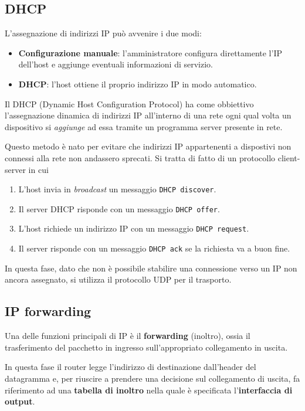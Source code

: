 \subsection{DHCP}
L'assegnazione di indirizzi IP può avvenire i due modi:
\begin{itemize}
	\item \textbf{Configurazione manuale}: l'amministratore configura 
		direttamente l'IP dell'host e aggiunge eventuali informazioni 
		di servizio.
	\item \textbf{DHCP}: l'host ottiene il proprio indirizzo IP in 
		modo automatico.
\end{itemize}
Il DHCP (Dynamic Host Configuration Protocol) ha come obbiettivo 
l'assegnazione dinamica di indirizzi IP all'interno di una rete ogni
qual volta un dispositivo si \emph{aggiunge} ad essa tramite un 
programma server presente in rete.

Questo metodo è nato per evitare che indirizzi IP appartenenti a 
dispostivi non connessi alla rete non andassero sprecati. Si tratta 
di fatto di un protocollo client-server in cui
\begin{enumerate}
	\item L'host invia in \emph{broadcast} un messaggio 
		\verb|DHCP discover|.
	\item Il server DHCP risponde con un messaggio \verb|DHCP offer|.
	\item L'host richiede un indirizzo IP con un messaggio 
		\verb|DHCP request|.
	\item Il server risponde con un messaggio \verb|DHCP ack| se la 
		richiesta va a buon fine.
\end{enumerate}
In questa fase, dato che non è possibile stabilire una connessione 
verso un IP non ancora assegnato, si utilizza il protocollo UDP per 
il trasporto.

\subsection{IP forwarding}
Una delle funzioni principali di IP è il \textbf{forwarding} 
(inoltro), ossia il trasferimento del pacchetto in ingresso 
sull'appropriato collegamento in uscita.

In questa fase il router legge l'indirizzo di destinazione 
dall'header del datagramma e, per riuscire a prendere una decisione 
sul collegamento di uscita, fa riferimento ad una 
\textbf{tabella di inoltro} nella quale è specificata
l'\textbf{interfaccia di output}.

